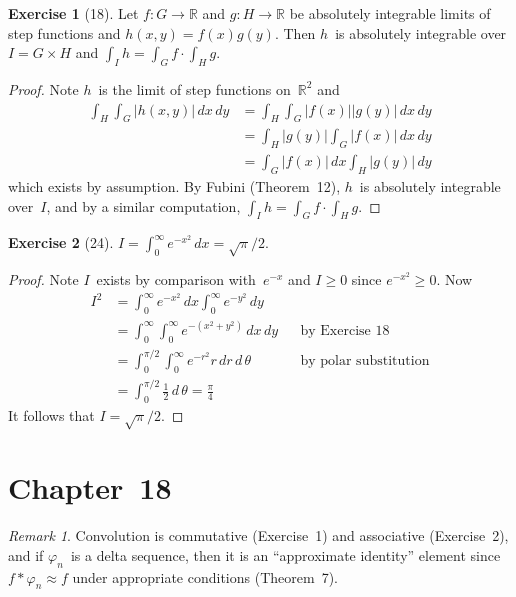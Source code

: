 \documentclass[letterpaper,12pt]{article}
\newcommand{\R}{\mathbb{R}}
\newcommand{\conv}{\ast}
\renewcommand{\d}[1]{\,d\!{#1}}
\newcommand{\dx}{\d{x}}
\newcommand{\dy}{\d{y}}
\newcommand{\abs}[1]{|{#1}|}
\theoremstyle{plain}
\theoremstyle{definition}
\newtheorem*{exer}{Exercise}
\theoremstyle{remark}
\newtheorem*{rmk}{Remark}
\begin{document}
\begin{exer}[18]
Let \(f:G\to\R\) and \(g:H\to\R\) be absolutely integrable limits of step functions and \(h(x,y)=f(x)g(y)\). Then \(h\)~is absolutely integrable over \(I=G\times H\) and \(\int_I h=\int_G f\cdot\int_H g\).
\end{exer}
\begin{proof}
Note \(h\)~is the limit of step functions on~\(\R^2\) and
\begin{align*}
\int_H\int_G\abs{h(x,y)}\dx\dy&=\int_H\int_G\abs{f(x)}\abs{g(y)}\dx\dy\\
	&=\int_H\abs{g(y)}\int_G\abs{f(x)}\dx\dy\\
	&=\int_G\abs{f(x)}\dx\int_H\abs{g(y)}\dy
\end{align*}
which exists by assumption. By Fubini (Theorem~12), \(h\)~is absolutely integrable over~\(I\), and by a similar computation, \(\int_I h=\int_G f\cdot\int_H g\).
\end{proof}

\begin{exer}[24]
\(I=\int_0^{\infty}e^{-x^2}\dx=\sqrt{\pi}/2\).
\end{exer}
\begin{proof}
Note \(I\)~exists by comparison with~\(e^{-x}\) and \(I\ge 0\) since \(e^{-x^2}\ge 0\). Now
\begin{align*}
I^2&=\int_0^{\infty}e^{-x^2}\dx\int_0^{\infty}e^{-y^2}\dy&&\\
	&=\int_0^{\infty}\int_0^{\infty}e^{-(x^2+y^2)}\dx\dy&&\text{by Exercise~18}\\
	&=\int_0^{\pi/2}\int_0^{\infty}e^{-r^2}r\d{r}\d{\,\theta}&&\text{by polar substitution}\\
	&=\int_0^{\pi/2}\frac{1}{2}\d{\,\theta}=\frac{\pi}{4}&&
\end{align*}
It follows that \(I=\sqrt{\pi}/2\).
\end{proof}

\section*{Chapter~18}
\begin{rmk}
Convolution is commutative (Exercise~1) and associative (Exercise~2), and if \(\varphi_n\)~is a delta sequence, then it is an ``approximate identity'' element since \(f\conv\varphi_n\approx f\) under appropriate conditions (Theorem~7).
\end{rmk}
\end{document}
